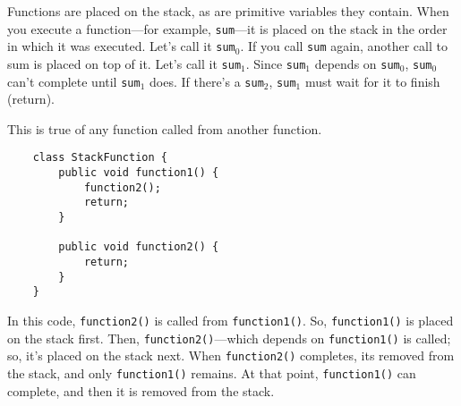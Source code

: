 \documentclass[12pt]{article}
\begin{document}
Functions are placed on the stack, as are primitive variables they
contain.  When you execute a function---for example, \texttt{sum}---it
is placed on the stack in the order in which it was executed. Let's
call it \texttt{sum}$_0$.  If you call \texttt{sum} again, another
call to sum is placed on top of it.  Let's call it \texttt{sum}$_1$.
Since \texttt{sum}$_1$ depends on \texttt{sum}$_0$, \texttt{sum}$_0$
can't complete until \texttt{sum}$_1$ does.  If there's a
\texttt{sum}$_2$, \texttt{sum}$_1$ must wait for it to finish
(return).

This is true of any function called from another function.

\begin{verbatim}
    class StackFunction {
        public void function1() {
            function2();
    	    return;
        }
    
        public void function2() {
        	return;
        }
    }
\end{verbatim}

In this code, \texttt{function2()} is called from
\texttt{function1()}.  So, \texttt{function1()} is placed on the stack
first.  Then, \texttt{function2()}---which depends on
\texttt{function1()} is called; so, it's placed on the stack next.
When \texttt{function2()} completes, its removed from the stack, and
only \texttt{function1()} remains.  At that point,
\texttt{function1()} can complete, and then it is removed from the
stack.
\end{document}
